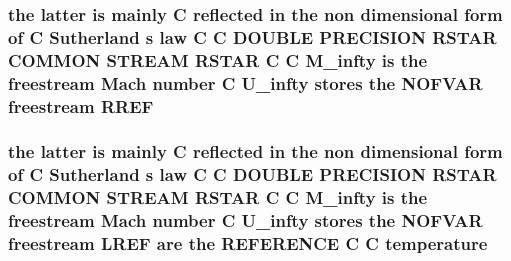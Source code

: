 \hypertarget{msa20_2home_2abonfi_2_c_f_d__codes_2_eul_f_s_83_82_83_2include_2stream_8com_a79112f231fb3da56eef3fc61c1e77bbd}{
\subsubsection[{R\-R\-E\-F}]{\setlength{\rightskip}{0pt plus 5cm}the latter is mainly C reflected in the non dimensional form of C Sutherland s law C C D\-O\-U\-B\-L\-E P\-R\-E\-C\-I\-S\-I\-O\-N R\-S\-T\-A\-R C\-O\-M\-M\-O\-N S\-T\-R\-E\-A\-M R\-S\-T\-A\-R C C {\bf M\-\_\-infty} is the freestream Mach number C {\bf U\-\_\-infty} stores the N\-O\-F\-V\-A\-R freestream R\-R\-E\-F}}\label{msa20_2home_2abonfi_2_c_f_d__codes_2_eul_f_s_83_82_83_2include_2stream_8com_a79112f231fb3da56eef3fc61c1e77bbd}
\hypertarget{msa20_2home_2abonfi_2_c_f_d__codes_2_eul_f_s_83_82_83_2include_2stream_8com_a46fb926ed83966d981ba4bbfd791eaed}{
\subsubsection[{temperature}]{\setlength{\rightskip}{0pt plus 5cm}the latter is mainly C reflected in the non dimensional form of C Sutherland s law C C D\-O\-U\-B\-L\-E P\-R\-E\-C\-I\-S\-I\-O\-N R\-S\-T\-A\-R C\-O\-M\-M\-O\-N S\-T\-R\-E\-A\-M R\-S\-T\-A\-R C C {\bf M\-\_\-infty} is the freestream Mach number C {\bf U\-\_\-infty} stores the N\-O\-F\-V\-A\-R freestream {\bf L\-R\-E\-F} {\bf are} the R\-E\-F\-E\-R\-E\-N\-C\-E C C temperature}}\label{msa20_2home_2abonfi_2_c_f_d__codes_2_eul_f_s_83_82_83_2include_2stream_8com_a46fb926ed83966d981ba4bbfd791eaed}
